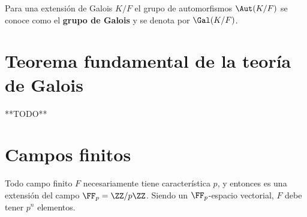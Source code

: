 \begin{definicion}
  Para una extensión de Galois $K/F$ el grupo de automorfismos $\Aut (K/F)$ se
  conoce como el \textbf{grupo de Galois} y se denota por $\Gal (K/F)$.
\end{definicion}


\section{Teorema fundamental de la teoría de Galois}

**TODO**


\section{Campos finitos}

Todo campo finito $F$ necesariamente tiene característica $p$, y entonces es una
extensión del campo $\FF_p = \ZZ/p\ZZ$. Siendo un $\FF_p$-espacio vectorial,
$F$ debe tener $p^n$ elementos.

